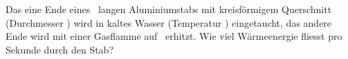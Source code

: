 Das eine Ende eines \lSO\ langen Aluminiumstabs mit kreisförmigem Querschnitt (Durchmesser \dSO) wird in kaltes Wasser (Temperatur \tkO) eingetaucht, das andere Ende wird mit einer Gasflamme auf \twO\ erhitzt. Wie viel Wärmeenergie fliesst pro Sekunde durch den Stab?
